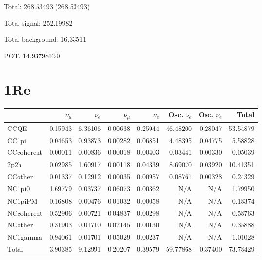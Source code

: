 \documentclass[10pt,a4paper]{article}
\begin{document}
Total: 268.53493    (268.53493)


Total signal: 252.19982


Total background: 16.33511

POT: 14.93798E20


\section*{1Re}
\begin{tabular} { | l ||r | r | r | r | r | r | | r | }
\hline
              & $\nu_\mu$            & $\nu_e$              & $\bar{\nu}_{\mu}$    & $\bar{\nu}_{e}$      & Osc. $\nu_e$         & Osc. $\bar{\nu}_{e}$ & Total                \\ \hline\hline
 CCQE         & 0.15943              & 6.36106              & 0.00638              & 0.25944              & 46.48200             & 0.28047              & 53.54879             \\ \hline
 CC1pi        & 0.04653              & 0.93873              & 0.00282              & 0.06851              & 4.48395              & 0.04775              & 5.58828              \\ \hline
 CCcoherent   & 0.00011              & 0.00836              & 0.00018              & 0.00403              & 0.03441              & 0.00330              & 0.05039              \\ \hline
 2p2h         & 0.02985              & 1.60917              & 0.00118              & 0.04339              & 8.69070              & 0.03920              & 10.41351             \\ \hline
 CCother      & 0.01337              & 0.12912              & 0.00035              & 0.00957              & 0.08761              & 0.00328              & 0.24329              \\ \hline
 NC1pi0       & 1.69779              & 0.03737              & 0.06073              & 0.00362              & N/A                  & N/A                  & 1.79950              \\ \hline
 NC1piPM      & 0.16808              & 0.00476              & 0.01032              & 0.00058              & N/A                  & N/A                  & 0.18374              \\ \hline
 NCcoherent   & 0.52906              & 0.00721              & 0.04837              & 0.00298              & N/A                  & N/A                  & 0.58763              \\ \hline
 NCother      & 0.31903              & 0.01710              & 0.02145              & 0.00130              & N/A                  & N/A                  & 0.35888              \\ \hline
 NC1gamma     & 0.94061              & 0.01701              & 0.05029              & 0.00237              & N/A                  & N/A                  & 1.01028              \\ \hline
\hline
 Total        & 3.90385              & 9.12991              & 0.20207              & 0.39579              & 59.77868             & 0.37400              & 73.78429             \\ \hline

\end{tabular}
\end{document}
